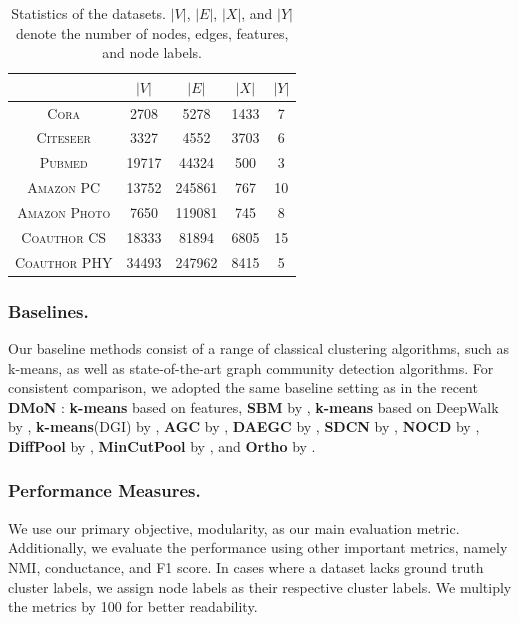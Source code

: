 \begin{table}[htbp]
\small
\centering
\begin{tabular}{ccccc}
\toprule
 & $|V|$ & $|E|$ & $|X|$ & $|Y|$ \\ \midrule
\textsc{Cora}             & 2708         & 5278         & 1433         & 7            \\
\textsc{Citeseer}         & 3327         & 4552         & 3703         & 6            \\
\textsc{Pubmed}           & 19717        & 44324        & 500          & 3            \\
\textsc{Amazon PC}        & 13752        & 245861       & 767          & 10           \\
\textsc{Amazon Photo}     & 7650         & 119081        & 745          & 8            \\
\textsc{Coauthor CS}      & 18333        & 81894        & 6805         & 15           \\
\textsc{Coauthor PHY}    & 34493        & 247962       & 8415         & 5            \\
\bottomrule
\end{tabular}
\caption{Statistics of the datasets. $|V|$, $|E|$, $|X|$, and $|Y|$ denote the number of nodes, edges, features, and node labels.}
\label{tab::dataset}
\end{table}


\subsubsection{Baselines.}
Our baseline methods consist of a range of classical clustering algorithms, such as k-means, as well as state-of-the-art graph community detection algorithms. For consistent comparison, we adopted the same baseline setting as in the recent \textbf{DMoN} \citep{muller2023graph}: \textbf{k-means} based on features, \textbf{SBM} by \citet{peixoto2014efficient}, \textbf{k-means} based on DeepWalk by \citet{perozzi2014deepwalk}, \textbf{k-means}(DGI) by \citet{velivckovic2018deep}, \textbf{AGC} by \citet{zhang2019attributed}, \textbf{DAEGC} by \citet{wang2019attributed}, \textbf{SDCN} by \citet{bo2020structural}, \textbf{NOCD} by \citet{shchur2019overlapping}, \textbf{DiffPool} by \citet{ying2018graph}, \textbf{MinCutPool} by \citet{bianchi2020spectral}, and \textbf{Ortho} by \citet{bianchi2020spectral}.  %


\subsubsection{Performance Measures.}
We use our primary objective, modularity, as our main evaluation metric. Additionally, we evaluate the performance using other important metrics, namely NMI, conductance, and F1 score. In cases where a dataset lacks ground truth cluster labels, we assign node labels as their respective cluster labels. We multiply the metrics by 100 for better readability.

